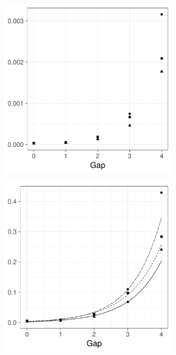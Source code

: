\begin{figure}[htbp]
    \centering
    \begin{subfigure}[b]{0.49\textwidth}
        \includegraphics[width=\textwidth]{results/by_pop_risk_distance/MISE-vs-population-risk-gap}
        \caption{}
        \label{fig:ise:p1.4_100_Gap_risk:mise}
    \end{subfigure}
    \begin{subfigure}[b]{0.49\textwidth}
        \includegraphics[width=\textwidth]{results/by_pop_risk_distance/RMISE-vs-population-risk-gap}
        \caption{}
        \label{fig:ise:p1.4_100_Gap_risk:rmise}
    \end{subfigure}


\end{figure}
